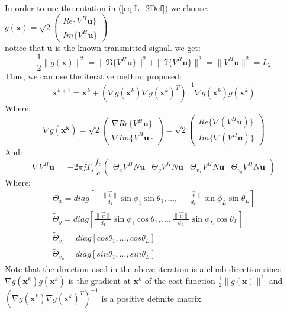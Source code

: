 In order to use the notation in (\ref{eq:L_2Def}) we choose:
$g(\mathbf{x})=\sqrt{2} \begin{pmatrix} Re\{V^H \mathbf{u}\} \\Im\{V^H \mathbf{u}\} \end{pmatrix}$ \\
notice that $\mathbf{u}$ is the known transmitted signal.
we get:
\begin{equation}
\frac{1}{2}\|g(\mathbf{x})\|^2=\|\Re\{V^H \mathbf{u}\}\|^2+\|\Im\{V^H \mathbf{u}\}\|^2 = \|V^H\mathbf{u} \|^2 = L_2
\end{equation}
Thus, we can use the iterative method proposed:
\begin{equation}
\mathbf{x}^{k+1}=\mathbf{x}^k +\left(\nabla g(\mathbf{x}^k)\nabla g(\mathbf{x}^k)^T\right)^{-1} \nabla g(\mathbf{x}^k) g(\mathbf{x}^k)
\end{equation}
Where:
\begin{equation}
\nabla g(\mathbf{x^k}) = \sqrt{2}
\begin{pmatrix} 
\nabla Re\{V^H\mathbf{u}\} \\ \nabla Im\{V^H\mathbf{u}\} 
\end{pmatrix}= \sqrt{2}
\begin{pmatrix} 
Re \{\nabla (V^H\mathbf{u})\} \\ Im\{\nabla (V^H\mathbf{u})\} 
\end{pmatrix}
\end{equation}
And:
\begin{equation}
\nabla V^H\mathbf{u}\ = -2 \pi j T_s \frac{f_c}{c}
\begin{pmatrix}  
\tilde{\Theta}_x V^H \tilde{N} \mathbf{u} &
\tilde{\Theta}_y V^H \tilde{N} \mathbf{u} &
\tilde{\Theta}_{v_x} V^H \tilde{N} \mathbf{u} &
\tilde{\Theta}_{v_y} V^H \tilde{N} \mathbf{u}
\end{pmatrix}
\end{equation}
Where: 
\begin{eqnarray}
\tilde{\Theta}_x = diag \left[-\frac{\|\vec{v}\|}{d_1} \sin \phi_1 \sin \theta_1, \dots ,-\frac{\|\vec{v}\|}{d_L} \sin \phi_L \sin \theta_L \right] \\
\tilde{\Theta}_y = diag \left[\frac{\|\vec{v}\|}{d_1} \sin \phi_1 \cos \theta_1, \dots ,\frac{\|\vec{v}\|}{d_L} \sin \phi_L \cos \theta_L \right]\\
\tilde{\Theta}_{v_x} = diag \left[cos \theta_1, \dots ,cos \theta_L \right] \\
\tilde{\Theta}_{v_y} = diag \left[sin \theta_1, \dots ,sin \theta_L \right]
\end{eqnarray}
Note that the direction used in the above iteration is a climb direction since 
$\nabla g(\mathbf{x}^k) g(\mathbf{x}^k)$ is the gradient at $\mathbf{x}^k$ of the cost function
$\frac{1}{2}\|g(\mathbf{x})\|^2$ and $\left(\nabla g(\mathbf{x}^k)\nabla g(\mathbf{x}^k)^T\right)^{-1}$ is a positive definite matrix.


